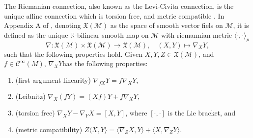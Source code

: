 \begin{definition}\label{def:riemannian_connection}
    The \textup{Riemanian connection}, also known as the \textup{Levi-Civita connection}, is the unique affine connection which is torsion free, and metric compatible \cite[Def.~6.4]{Tu2017}. In Appendix A of \cite{JensenZimmermann2024}, denoting $\mathfrak{X}(\mathcal{M})$ as the space of smooth vector fiels on $\mathcal{M}$, it is defined as the unique $\mathbb{R}$-bilinear smooth map on $\mathcal{M}$ with riemannian metric $\langle \cdot, \cdot\rangle_{p}$
    \begin{equation*}
        \nabla:\mathfrak{X}(\mathcal{M})\times \mathfrak{X}(\mathcal{M})\xrightarrow{}\mathfrak{X}(\mathcal{M}),\quad (X,Y)\mapsto \nabla_{X}Y,
    \end{equation*}
    such that the following properties hold. Given $X,Y,Z\in \mathfrak{X}(\mathcal{M})$, and $f\in \mathcal{C}^{\infty}(M)$, $\nabla_{X}Y$has the following properties:
    \begin{enumerate}
        \item (first argument linearity) $\nabla_{fX}Y=f \nabla_{X}Y$, 
        \item {}(Leibnitz) $\nabla_{X}(fY)=(Xf)Y+f \nabla_{X}Y$, 
        \item (torsion free) $\nabla_{X}Y-\nabla_{Y}X=[X,Y]$, where $[\cdot,\cdot]$ is the Lie bracket, and
        \item (metric compatibility) $Z \langle X,Y\rangle=\langle \nabla_{Z}X,Y\rangle+\langle X,\nabla_{Z}Y\rangle$.
    \end{enumerate}
\end{definition}

\begin{definition}\label{def:christoffel_symbols}
    
\end{definition}

\begin{definition}[]\label{def:}
    
\end{definition}

\begin{definition}[]\label{def:}
    
\end{definition}

\begin{definition}[]\label{def:}
    
\end{definition}
    


